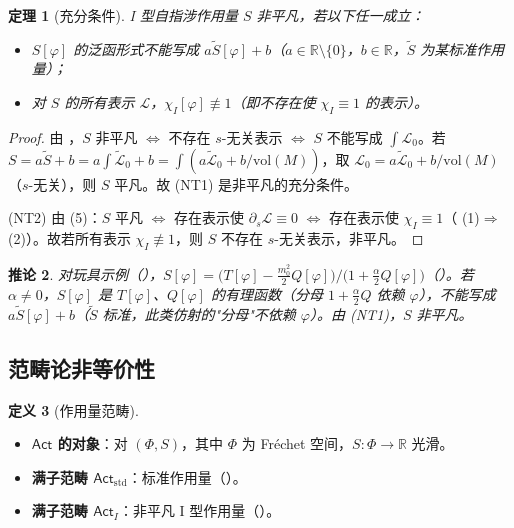 \documentclass[12pt,a4paper]{article}
\newtheorem{theorem}{定理}[section]
\newtheorem{corollary}[theorem]{推论}
\theoremstyle{definition}
\newtheorem{definition}[theorem]{定义}
\newcommand{\mL}{\mathcal{L}}
\newcommand{\mPhi}{\Phi}
\newcommand{\vol}{\mathrm{vol}}
\newcommand{\R}{\mathbb{R}}
\newcommand{\chiI}{\chi_I}
\begin{document}
\begin{theorem}[充分条件]
\label{thm:p13}
I 型自指涉作用量 $S$ 非平凡，若以下任一成立：
\begin{itemize}
\item[(NT1)] $S[\varphi]$ 的泛函形式不能写成 $a \tilde{S}[\varphi] + b$（$a \in \R \setminus\{0\}$，$b \in \R$，$\tilde{S}$ 为某标准作用量）；
\item[(NT2)] 对 $S$ 的\emph{所有}表示 $\mL$，$\chiI[\varphi] \not\equiv 1$（即不存在使 $\chiI \equiv 1$ 的表示）。
\end{itemize}
\end{theorem}

\begin{proof}
由 ，$S$ 非平凡 $\iff$ 不存在 $s$-无关表示 $\iff$ $S$ 不能写成 $\int \mL_0$。若 $S = a\tilde{S} + b = a\int\tilde{\mL}_0 + b = \int(a\tilde{\mL}_0 + b/\vol(M))$，取 $\mL_0 = a\tilde{\mL}_0 + b/\vol(M)$（$s$-无关），则 $S$ 平凡。故 (NT1) 是非平凡的充分条件。

(NT2) 由  (5)：$S$ 平凡 $\iff$ 存在表示使 $\partial_s \mL \equiv 0$ $\iff$ 存在表示使 $\chiI \equiv 1$（ (1)$\Rightarrow$(2)）。故若所有表示 $\chiI \not\equiv 1$，则 $S$ 不存在 $s$-无关表示，非平凡。
\end{proof}

\begin{corollary}
\label{cor:nontriv}
对玩具示例（），$S[\varphi] = \bigl(T[\varphi] - \frac{m_0^2}{2}Q[\varphi]\bigr)/\bigl(1 + \frac{\alpha}{2}Q[\varphi]\bigr)$（）。若 $\alpha \neq 0$，$S[\varphi]$ 是 $T[\varphi]$、$Q[\varphi]$ 的有理函数（分母 $1 + \frac{\alpha}{2}Q$ 依赖 $\varphi$），不能写成 $a\tilde{S}[\varphi] + b$（$\tilde{S}$ 标准，此类仿射的"分母"不依赖 $\varphi$）。由  (NT1)，$S$ 非平凡。
\end{corollary}

\subsection{范畴论非等价性}
\label{sec:cat}

\begin{definition}[作用量范畴]
\leavevmode
\begin{itemize}
\item \textbf{$\mathsf{Act}$ 的对象}：对 $(\mPhi, S)$，其中 $\mPhi$ 为 Fr\'echet 空间，$S: \mPhi \to \R$ 光滑。
\item \textbf{满子范畴 $\mathsf{Act}_{\mathrm{std}}$}：标准作用量（）。
\item \textbf{满子范畴 $\mathsf{Act}_I$}：非平凡 I 型作用量（）。
\end{itemize}
\end{definition}
\end{document}
